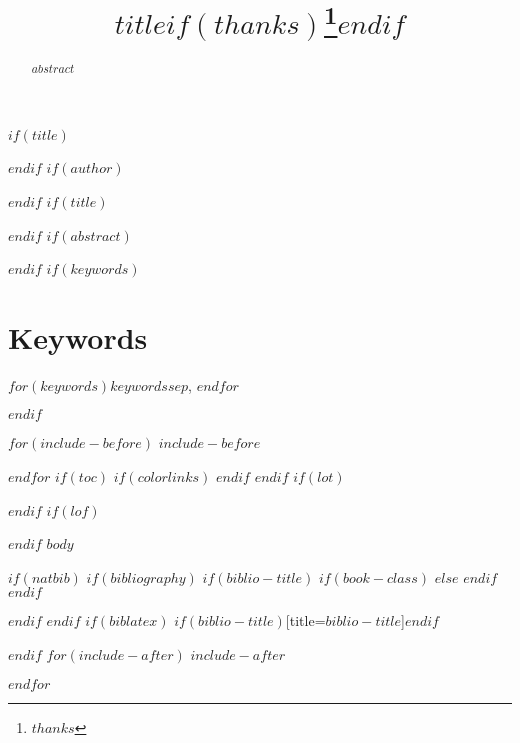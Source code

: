 \documentclass[$if(fontsize)$$fontsize$,$endif$$if(lang)$$babel-lang$,$endif$$if(papersize)$$papersize$paper,$endif$$for(classoption)$$classoption$$sep$,$endfor$]{$documentclass$}
\begin{document}
\pagestyle{front}

$if(title)$
\title{$title$$if(thanks)$\thanks{$thanks$}$endif$}

$endif$
$if(author)$

$endif$
$if(title)$
\maketitle
\thispagestyle{front}

$endif$
$if(abstract)$
\begin{abstract}
$abstract$
\end{abstract}

$endif$
$if(keywords)$
\section*{Keywords}
$for(keywords)$$keywords$$sep$, $endfor$

$endif$

\clearpage
\pagestyle{main}

$for(include-before)$
$include-before$

$endfor$
$if(toc)$
{
$if(colorlinks)$
\hypersetup{linkcolor=$if(toccolor)$$toccolor$$else$black$endif$}
$endif$
\setcounter{tocdepth}{$toc-depth$}
\tableofcontents
}
$endif$
$if(lot)$
\listoftables
$endif$
$if(lof)$
\listoffigures
$endif$
$body$

$if(natbib)$
$if(bibliography)$
$if(biblio-title)$
$if(book-class)$
\renewcommand\bibname{$biblio-title$}
$else$
\renewcommand\refname{$biblio-title$}
$endif$
$endif$
{\small
}

$endif$
$endif$
$if(biblatex)$
\printbibliography$if(biblio-title)$[title=$biblio-title$]$endif$

$endif$
$for(include-after)$
$include-after$

$endfor$
\end{document}
